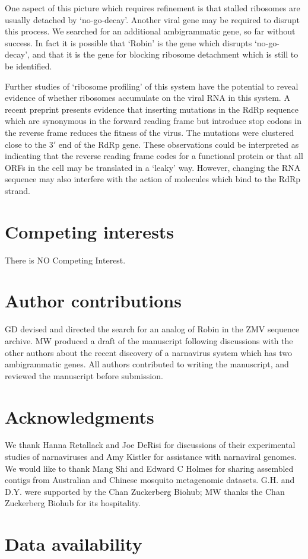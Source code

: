 \documentclass[unnumsec,webpdf,contemporary,large,namedate]{oup-authoring-template}%
\theoremstyle{thmstyleone}%
\theoremstyle{thmstyletwo}%
\theoremstyle{thmstylethree}%
\begin{document}
One aspect of this picture which requires refinement is that stalled ribosomes are usually detached
by \lq no-go-decay'. Another viral gene may be required to disrupt this process. We searched
for an additional ambigrammatic gene, so far without success. In fact it is possible that \lq Robin'
is the gene which disrupts \lq no-go-decay', and that it is the gene for blocking ribosome detachment
which is still to be identified.

Further studies of \lq ribosome profiling' of this system have the potential to reveal evidence
of whether ribosomes accumulate on the viral RNA in this system.  A recent preprint \citep{Ret+20}
presents evidence that inserting mutations in the RdRp sequence which are synonymous in the forward
reading frame but introduce stop codons in the reverse frame reduces the fitness of the virus. The mutations
were clustered close to the $3'$ end of the RdRp gene. These
observations could be interpreted as indicating that the reverse reading frame codes for a functional
protein or that all ORFs in the cell may be translated in a \lq leaky' way.
However, changing the RNA sequence may also interfere with the action of molecules which
bind to the RdRp strand.


\section{Competing interests}
There is NO Competing Interest.

\section{Author contributions}

GD devised and directed the search for an analog of Robin in the ZMV sequence
archive. MW produced a draft of the manuscript following discussions with the other
authors about the recent discovery of a narnavirus system which has two
ambigrammatic genes. All authors contributed to writing the manuscript, and
reviewed the manuscript before submission.


\section{Acknowledgments}

We thank Hanna Retallack and Joe DeRisi for discussions of their experimental studies of narnaviruses
and Amy Kistler for assistance with narnaviral genomes.
We would like to thank Mang Shi and Edward C Holmes for sharing assembled contigs from Australian and Chinese mosquito metagenomic datasets.
G.H. and D.Y. were supported by the Chan Zuckerberg Biohub;
MW thanks the Chan Zuckerberg Biohub for its hospitality.

\section{Data availability}






%
%
\end{document}

